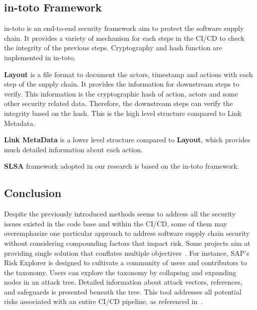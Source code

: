
    



\subsection{in-toto Framework}
in-toto is an end-to-end security framework aim to protect the software supply chain. It provides a variety
of mechanism for each steps in the CI/CD to check the integrity of the previous steps. Cryptography and hash 
function are implemented in in-toto.

\textbf{Layout} is a file format to document the actors, timestamp and actions with each step of the supply chain.
It provides the information for downstream steps to verify. This information is the cryptographic hash of action, actors and some other security
related data. Therefore, the downstream steps can verify the integrity based on the hash. This is the high level structure 
compared to Link Metadata.

\textbf{Link MetaData} is a lower level structure compared to \textbf{Layout}, which provides much detailed information about each action.

\textbf{SLSA} framework adopted in our research is based on the in-toto framework.

\subsection{Conclusion}
Despite the previously introduced methods seems to address all the security issues
existed in the code base and within the CI/CD, some of them may overemphasize one 
particular approach to address software supply chain security without considering 
compounding factors that impact risk.
Some projects aim at providing single solution that conﬂates multiple 
objectives~\cite{melara2022software}.
For instance, SAP's Risk Explorer is designed to cultivate a community of users 
and contributors to the taxonomy. Users can explore the taxonomy by collapsing and 
expanding nodes in an attack tree. Detailed information about attack vectors, 
references, and safeguards is presented beneath the tree. 
This tool addresses all potential risks associated with an entire CI/CD pipeline, 
as referenced in~\cite{ladisa2023journey}.

